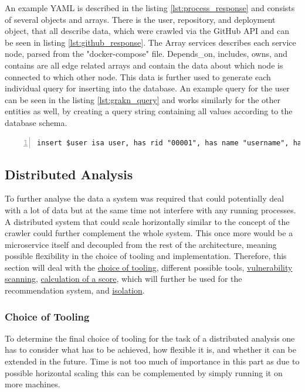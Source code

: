 An example YAML is described in the listing \ref{lst:process_response} and consists of several objects and arrays. There is the user, repository, and deployment object, that all describe data, which were crawled via the GitHub API and can be seen in listing \ref{lst:github_response}.
The Array services describes each service node, parsed from the "docker-compose" file. Depends\_on, includes, owns, and contains are all edge related arrays and contain the data about which node is connected to which other node.
This data is further used to generate each individual query for inserting into the database. An example query for the user can be seen in the listing \ref{lst:grakn_query} and works similarly for the other entities as well, by creating a query string containing all values according to the database schema.

\begin{lstlisting}[caption=Grakn query, breaklines=true, label=lst:grakn_query, numbers=left,  basicstyle=\footnotesize\singlespacing]
insert $user isa user, has rid "00001", has name "username", has platform "github", has schemaVersion 1, has updated Date, has created Date;
\end{lstlisting}

\subsection{Distributed Analysis}
\label{sec:distributed_analysis}
To further analyse the data a system was required that could potentially deal with a lot of data but at the same time not interfere with any running processes. A distributed system that could scale horizontally similar to the concept of the crawler could further complement the whole system. This once more would be a microservice itself and decoupled from the rest of the architecture, meaning possible flexibility in the choice of tooling and implementation. Therefore, this section will deal with the \hyperref[sec:choice_of_tooling]{choice of tooling}, different possible tools, \hyperref[sec:vulnerability_scanning]{vulnerability scanning}, \hyperref[sec:calculation_of_score]{calculation of a score}, which will further be used for the recommendation system, and \hyperref[sec:importance_of_isolation]{isolation}.

\subsubsection{Choice of Tooling}
\label{sec:choice_of_tooling}
To determine the final choice of tooling for the task of a distributed analysis one has to consider what has to be achieved, how flexible it is, and whether it can be extended in the future. Time is not too much of importance in this part as due to possible horizontal scaling this can be complemented by simply running it on more machines.

